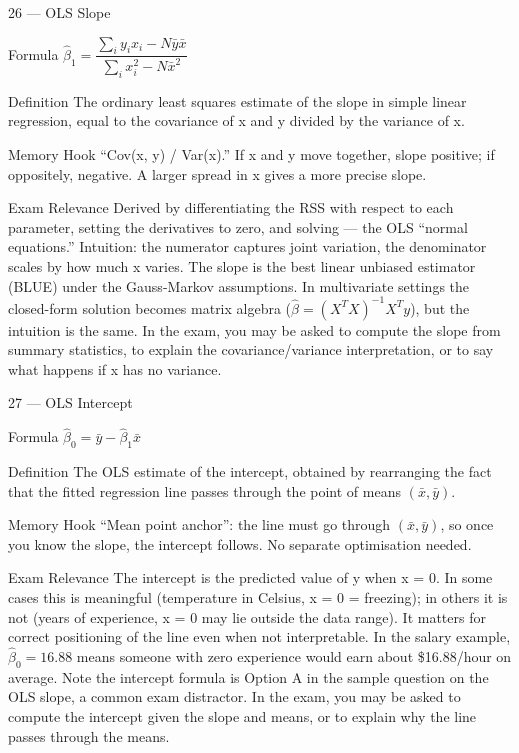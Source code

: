 \documentclass[aspectratio=169,8pt]{beamer}
\begin{document}
	\begin{frame}{26 --- OLS Slope}
		\begin{block}{Formula}
			$\hat{\beta}_1 = \dfrac{\sum_i y_i x_i - N\bar{y}\bar{x}}{\sum_i x_i^2 - N\bar{x}^2}$
		\end{block}
		\begin{block}{Definition}
			The ordinary least squares estimate of the slope in simple linear regression, equal to the covariance of x and y divided by the variance of x.
		\end{block}
		\begin{block}{Memory Hook}
			``Cov(x, y) / Var(x).'' If x and y move together, slope positive; if oppositely, negative. A larger spread in x gives a more precise slope.
		\end{block}
		\begin{block}{Exam Relevance}
			Derived by differentiating the RSS with respect to each parameter, setting the derivatives to zero, and solving --- the OLS ``normal equations.'' Intuition: the numerator captures joint variation, the denominator scales by how much x varies. The slope is the best linear unbiased estimator (BLUE) under the Gauss-Markov assumptions. In multivariate settings the closed-form solution becomes matrix algebra ($\hat{\beta} = (X^TX)^{-1}X^Ty$), but the intuition is the same. In the exam, you may be asked to compute the slope from summary statistics, to explain the covariance/variance interpretation, or to say what happens if x has no variance.
		\end{block}
	\end{frame}
	
	\begin{frame}{27 --- OLS Intercept}
		\begin{block}{Formula}
			$\hat{\beta}_0 = \bar{y} - \hat{\beta}_1\bar{x}$
		\end{block}
		\begin{block}{Definition}
			The OLS estimate of the intercept, obtained by rearranging the fact that the fitted regression line passes through the point of means $(\bar{x}, \bar{y})$.
		\end{block}
		\begin{block}{Memory Hook}
			``Mean point anchor'': the line must go through $(\bar{x}, \bar{y})$, so once you know the slope, the intercept follows. No separate optimisation needed.
		\end{block}
		\begin{block}{Exam Relevance}
			The intercept is the predicted value of y when x = 0. In some cases this is meaningful (temperature in Celsius, x = 0 = freezing); in others it is not (years of experience, x = 0 may lie outside the data range). It matters for correct positioning of the line even when not interpretable. In the salary example, $\hat{\beta}_0 = 16.88$ means someone with zero experience would earn about \$16.88/hour on average. Note the intercept formula is Option A in the sample question on the OLS slope, a common exam distractor. In the exam, you may be asked to compute the intercept given the slope and means, or to explain why the line passes through the means.
		\end{block}
	\end{frame}
	
\end{document}
